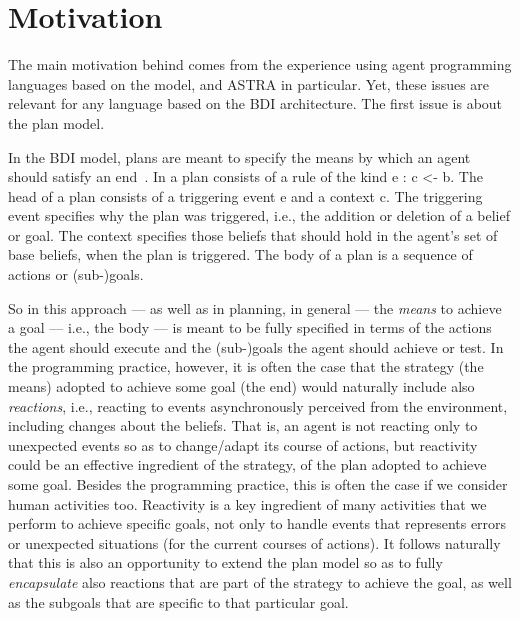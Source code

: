 \section{Motivation}
\label{sec:motivation}

The main motivation behind {\aser} comes from the experience using
agent programming languages based on the {\asl} model, {\jason} and
ASTRA in particular.
%
Yet, these issues are relevant for any language based on the BDI
architecture.
%
The first issue is about the plan model.

%
In the BDI model, plans are meant to specify the means by which an
agent should satisfy an end~\cite{Rao96}.
%
In {\asl} a plan consists of a rule of the kind \textsf{e : c <- b}.
%
The head of a plan consists of a triggering event \textsf{e} and a context \textsf{c}.
%
The triggering event specifies why the plan was triggered, i.e., the addition or deletion of a belief or goal. 
%
The context specifies those beliefs that should hold in the agent's set of base beliefs, when the plan is triggered. 
%
The body of a plan is a sequence of actions or (sub-)goals.
%

%
%
So in this approach --- as well as in planning, in general --- the
\emph{means} to achieve a goal --- i.e., the body --- is meant to be
fully specified in terms of the actions the agent should execute and
the (sub-)goals the agent should achieve or test.
%
In the programming practice, however, it is often the case that the
strategy (the means) adopted to achieve some goal (the end) would
naturally include also \emph{reactions}, i.e., reacting to events
asynchronously perceived from the environment, including changes about
the beliefs.
% 
That is, an agent is not reacting only to unexpected events so as to
change/adapt its course of actions, but reactivity could be an
effective ingredient of the strategy, of the plan adopted to achieve
some goal.
%
Besides the programming practice, this is often the case if we
consider human activities too. Reactivity is a key ingredient of many
activities that we perform to achieve specific goals, not only to
handle events that represents errors or unexpected situations (for the
current courses of actions).
%
It follows naturally that this is also an opportunity to extend the
plan model so as to fully \emph{encapsulate} also reactions that are
part of the strategy to achieve the goal, as well as the subgoals that
are specific to that particular goal.


